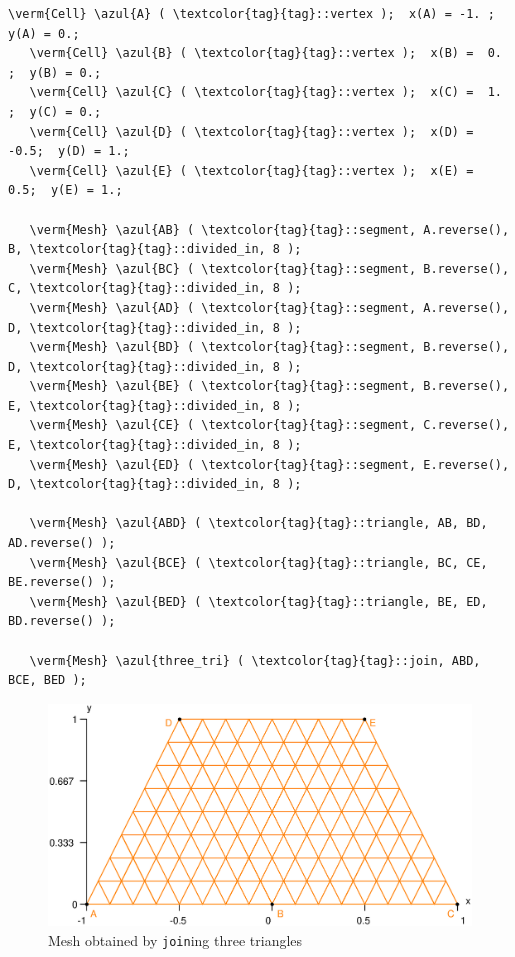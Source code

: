 \begin{Verbatim}[commandchars=\\\{\},formatcom=\small\tt,frame=single,
   label=parag-\ref{\numb section 1.\numb parag 4}.cpp,rulecolor=\color{coment},
   baselinestretch=0.94,framesep=2mm]
   \verm{Cell} \azul{A} ( \textcolor{tag}{tag}::vertex );  x(A) = -1. ;  y(A) = 0.;
   \verm{Cell} \azul{B} ( \textcolor{tag}{tag}::vertex );  x(B) =  0. ;  y(B) = 0.;
   \verm{Cell} \azul{C} ( \textcolor{tag}{tag}::vertex );  x(C) =  1. ;  y(C) = 0.;
   \verm{Cell} \azul{D} ( \textcolor{tag}{tag}::vertex );  x(D) = -0.5;  y(D) = 1.;
   \verm{Cell} \azul{E} ( \textcolor{tag}{tag}::vertex );  x(E) =  0.5;  y(E) = 1.;

   \verm{Mesh} \azul{AB} ( \textcolor{tag}{tag}::segment, A.reverse(), B, \textcolor{tag}{tag}::divided_in, 8 );
   \verm{Mesh} \azul{BC} ( \textcolor{tag}{tag}::segment, B.reverse(), C, \textcolor{tag}{tag}::divided_in, 8 );
   \verm{Mesh} \azul{AD} ( \textcolor{tag}{tag}::segment, A.reverse(), D, \textcolor{tag}{tag}::divided_in, 8 );
   \verm{Mesh} \azul{BD} ( \textcolor{tag}{tag}::segment, B.reverse(), D, \textcolor{tag}{tag}::divided_in, 8 );
   \verm{Mesh} \azul{BE} ( \textcolor{tag}{tag}::segment, B.reverse(), E, \textcolor{tag}{tag}::divided_in, 8 );
   \verm{Mesh} \azul{CE} ( \textcolor{tag}{tag}::segment, C.reverse(), E, \textcolor{tag}{tag}::divided_in, 8 );
   \verm{Mesh} \azul{ED} ( \textcolor{tag}{tag}::segment, E.reverse(), D, \textcolor{tag}{tag}::divided_in, 8 );

   \verm{Mesh} \azul{ABD} ( \textcolor{tag}{tag}::triangle, AB, BD, AD.reverse() );
   \verm{Mesh} \azul{BCE} ( \textcolor{tag}{tag}::triangle, BC, CE, BE.reverse() );
   \verm{Mesh} \azul{BED} ( \textcolor{tag}{tag}::triangle, BE, ED, BD.reverse() );

   \verm{Mesh} \azul{three_tri} ( \textcolor{tag}{tag}::join, ABD, BCE, BED );
\end{Verbatim}

\begin{figure}[ht] \centering
  \includegraphics[width=130mm]{three-tri}
  \caption{Mesh obtained by {\small\tt join}ing three triangles}
  \label{\numb section 1.\numb fig 7}
\end{figure}


